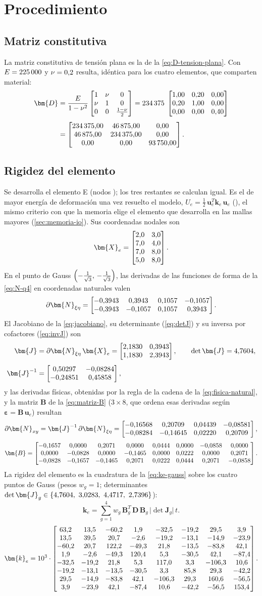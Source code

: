 \section{Procedimiento}

\subsection{Matriz constitutiva}

La matriz constitutiva de tensión plana es la de la \autoref{eq:D-tension-plana}. Con $E=225\,000$ y $\nu=0{,}2$ resulta, idéntica para los cuatro elementos, que comparten material:
\begin{align*}
\bm{D}&=\frac{E}{1-\nu^{2}}
\begin{bmatrix} 1 & \nu & 0 \\ \nu & 1 & 0 \\ 0 & 0 & \tfrac{1-\nu}{2} \end{bmatrix}
=\valDfactor\;\DmatNorm \\[0.4em]
&=\Dmat .
\end{align*}

\subsection{Rigidez del elemento}

Se desarrolla el elemento E\showId{} (nodos \showNodes); los tres restantes se calculan igual. Es el de mayor energía de deformación una vez resuelto el modelo, $U_e=\tfrac12\,\bm{u}_e^{T}\bm{k}_e\,\bm{u}_e$ (\energiaInline), el mismo criterio con que la memoria elige el elemento que desarrolla en las mallas mayores (\autoref{sec:memoria-io}). Sus coordenadas nodales son
\[
\bm{X}_e=\Xemat .
\]
En el punto de Gauss $\left(-\tfrac{1}{\sqrt{3}},\,-\tfrac{1}{\sqrt{3}}\right)$, las derivadas de las funciones de forma de la \autoref{eq:N-q4} en coordenadas naturales valen
\[
\partial\bm{N}_{\xi\eta}=\dNnatA .
\]
El Jacobiano de la \autoref{eq:jacobiano}, su determinante (\autoref{eq:detJ}) y su inversa por cofactores (\autoref{eq:invJ}) son
\begin{align*}
\bm{J}&=\partial\bm{N}_{\xi\eta}\,\bm{X}_e=\Jmata, \qquad
\det\bm{J}=\detJa, \\[0.4em]
\bm{J}^{-1}&=\invJa,
\end{align*}
y las derivadas físicas, obtenidas por la regla de la cadena de la \autoref{eq:fisica-natural}, y la matriz $\bm{B}$ de la \autoref{eq:matriz-B} ($3\times 8$, que ordena esas derivadas según $\bm{\varepsilon}=\bm{B}\,\bm{u}_e$) resultan
\[
\partial\bm{N}_{xy}=\bm{J}^{-1}\,\partial\bm{N}_{\xi\eta}=\dNphysA ,
\]
{\footnotesize\setlength{\arraycolsep}{4pt}
\[
\bm{B}=\Bmata .
\]
}%
La rigidez del elemento es la cuadratura de la \autoref{eq:ke-gauss} sobre los cuatro puntos de Gauss (pesos $w_g=1$; determinantes $\det\bm{J}_g \in \{\detJinline\}$):
\[
\bm{k}_e=\sum_{g=1}^{4} w_g\,\bm{B}_g^{T}\,\bm{D}\,\bm{B}_g\,\lvert\det\bm{J}_g\rvert\,t .
\]
{\footnotesize\setlength{\arraycolsep}{3.5pt}
\[
\bm{k}_e=\keScale\cdot\keMat .
\]
}%

